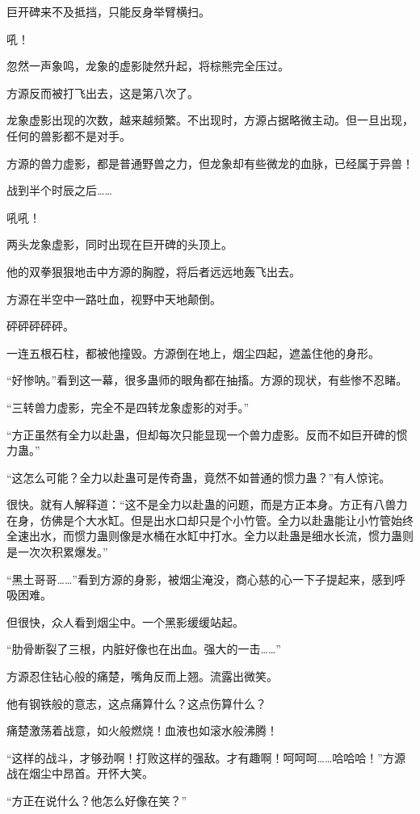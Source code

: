 \begin{this_body}
巨开碑来不及抵挡，只能反身举臂横扫。

吼！

忽然一声象鸣，龙象的虚影陡然升起，将棕熊完全压过。

方源反而被打飞出去，这是第八次了。

龙象虚影出现的次数，越来越频繁。不出现时，方源占据略微主动。但一旦出现，任何的兽影都不是对手。

方源的兽力虚影，都是普通野兽之力，但龙象却有些微龙的血脉，已经属于异兽！

战到半个时辰之后……

吼吼！

两头龙象虚影，同时出现在巨开碑的头顶上。

他的双拳狠狠地击中方源的胸膛，将后者远远地轰飞出去。

方源在半空中一路吐血，视野中天地颠倒。

砰砰砰砰砰。

一连五根石柱，都被他撞毁。方源倒在地上，烟尘四起，遮盖住他的身形。

“好惨呐。”看到这一幕，很多蛊师的眼角都在抽搐。方源的现状，有些惨不忍睹。

“三转兽力虚影，完全不是四转龙象虚影的对手。”

“方正虽然有全力以赴蛊，但却每次只能显现一个兽力虚影。反而不如巨开碑的惯力蛊。”

“这怎么可能？全力以赴蛊可是传奇蛊，竟然不如普通的惯力蛊？”有人惊诧。

很快。就有人解释道：“这不是全力以赴蛊的问题，而是方正本身。方正有八兽力在身，仿佛是个大水缸。但是出水口却只是个小竹管。全力以赴蛊能让小竹管始终全速出水，而惯力蛊则像是水桶在水缸中打水。全力以赴蛊是细水长流，惯力蛊则是一次次积累爆发。”

“黑土哥哥……”看到方源的身影，被烟尘淹没，商心慈的心一下子提起来，感到呼吸困难。

但很快，众人看到烟尘中。一个黑影缓缓站起。

“肋骨断裂了三根，内脏好像也在出血。强大的一击……”

方源忍住钻心般的痛楚，嘴角反而上翘。流露出微笑。

他有钢铁般的意志，这点痛算什么？这点伤算什么？

痛楚激荡着战意，如火般燃烧！血液也如滚水般沸腾！

“这样的战斗，才够劲啊！打败这样的强敌。才有趣啊！呵呵呵……哈哈哈！”方源战在烟尘中昂首。开怀大笑。

“方正在说什么？他怎么好像在笑？”


\end{this_body}
